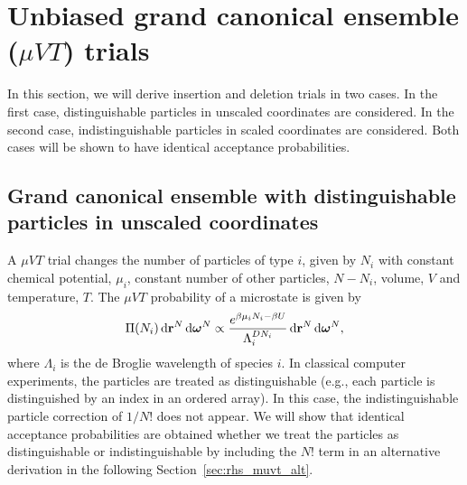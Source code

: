 \section{\label{sec:rhs_muvt}Unbiased grand canonical ensemble ($\mu VT$) trials}

In this section, we will derive insertion and deletion trials in two cases.
In the first case, distinguishable particles in unscaled coordinates are considered.
In the second case, indistinguishable particles in scaled coordinates are considered.
Both cases will be shown to have identical acceptance probabilities.

\subsection{\label{sec:rhs_muvt_distinguishable}Grand canonical ensemble with distinguishable particles in unscaled coordinates}

A $\mu VT$ trial changes the number of particles of type $i$, given by $N_i$ with constant chemical potential, $\mu_i$, constant number of other particles, $N-N_i$, volume, $V$ and temperature, $T$.
The $\mu VT$ probability of a microstate is given by \cite{norman_investigation_1969, adams_grand_1975, allen_computer_1989, frenkel_understanding_2002}
\begin{equation}
\Pi(N_i) \mathop{}\!\mathrm{d}\mathbf{r}^N \mathop{}\!\mathrm{d}\boldsymbol{\omega}^N\propto \frac{e^{\beta\mu_i N_i - \beta U}}{\Lambda_i^{DN_i}} \mathop{}\!\mathrm{d}\mathbf{r}^N\mathop{}\!\mathrm{d}\boldsymbol{\omega}^N,
\label{eq:rhs_muvt_pi}
\end{equation}
where $\Lambda_i$ is the de Broglie wavelength of species $i$.
In classical computer experiments, the particles are treated as distinguishable (e.g., each particle is distinguished by an index in an ordered array).
In this case, the indistinguishable particle correction of $1/N!$ does not appear.
We will show that identical acceptance probabilities are obtained whether we treat the particles as distinguishable or indistinguishable by including the $N!$ term in an alternative derivation in the following Section~\ref{sec:rhs_muvt_alt}.

